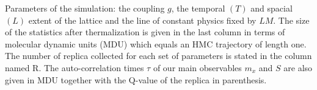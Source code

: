 Parameters of the simulation: the coupling $g$, the temporal $(T)$ and spacial $(L)$ extent of the lattice and the line of constant physics fixed by $LM$. The size of the statistics after thermalization is given in the last column in terms of molecular dynamic units (MDU) which equals an HMC trajectory of length one. The number of replica collected for each set of parameters is stated in the column named R. The auto-correlation times $\tau$ of our main observables $m_{x}$ and $S$ are also given in MDU together with the Q-value of the replica in parenthesis. \label{tab: runs_param}